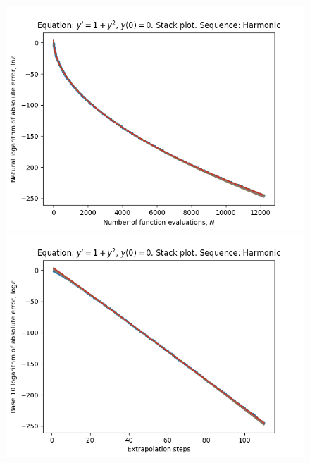\begin{figure}[H]
\centering
\begin{minipage}{0.45\textwidth}
\centering
\includegraphics[scale=0.45]{emr_plots/tangens_hp_harmonic_stack.png}
\end{minipage}
\begin{minipage}{0.45\textwidth}
\centering
\includegraphics[scale=0.45]{emr_plots/tangens_hp_harmonic_steps_stack.png}
\end{minipage}
\end{figure}

